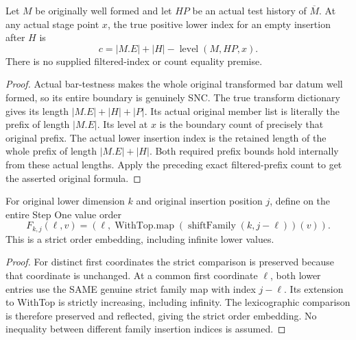\begin{theorem}
\label{hir:original-positive-short-lower-index-exact}
\leanok
{}
Let $M$ be originally well formed and let $HP$ be an actual test history of
$\overline M$. At any actual stage point $x$, the true positive lower index
for an empty insertion after $H$ is
\[
 c=|M.E|+|H|-\operatorname{level}(M,HP,x).
\]
There is no supplied filtered-index or count equality premise.
\end{theorem}
\begin{proof}
Actual bar-testness makes the whole original transformed bar datum well formed,
so its entire boundary is genuinely SNC. The true transform dictionary gives
its length $|M.E|+|H|+|P|$. Its actual original member list is literally the
prefix of length $|M.E|$. Its level at $x$ is the boundary count of precisely
that original prefix. The actual lower insertion index is the retained length
of the whole prefix of length $|M.E|+|H|$. Both required prefix bounds hold
internally from these actual lengths. Apply the preceding exact filtered-prefix
count to get the asserted original formula.
\end{proof}

\begin{definition}
\label{hir:original-short-history-step-map}
\leanok
{}
For original lower dimension $k$ and original insertion position $j$, define
on the entire Step One value order
\[
 F_{k,j}(\ell,v)=(\ell,\operatorname{WithTop.map}
          (\operatorname{shiftFamily}(k,j-\ell))(v)).
\]
This is a strict order embedding, including infinite lower values.
\end{definition}
\begin{proof}
For distinct first coordinates the strict comparison is preserved because
that coordinate is unchanged. At a common first coordinate $\ell$, both lower
entries use the SAME genuine strict family map with index $j-\ell$.
Its extension to WithTop is strictly increasing, including infinity. The
lexicographic comparison is therefore preserved and reflected, giving the
strict order embedding. No inequality between different family insertion
indices is assumed.
\end{proof}

